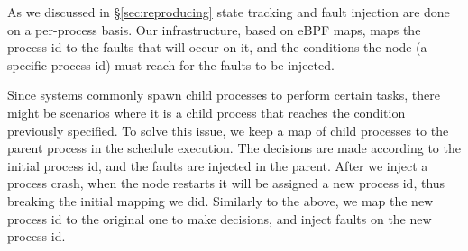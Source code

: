  As we discussed in \S\ref{sec:reproducing} state tracking and fault injection are done on a per-process basis. Our infrastructure, based on eBPF maps, maps the process id to the faults that will occur on it, and the conditions the node (a specific process id) must reach for the faults to be injected.

Since systems commonly spawn child processes to perform certain tasks, there might be scenarios where it is a child process that reaches the condition previously specified.
To solve this issue, we keep a map of child processes to the parent process in the schedule execution.
The decisions are made according to the initial process id, and the faults are injected in the parent. After we inject a process crash, when the node restarts it will be assigned a new process id, thus breaking the initial mapping we did. Similarly to the above, we map the new process id to the original one to make decisions, and inject faults on the new process id.


